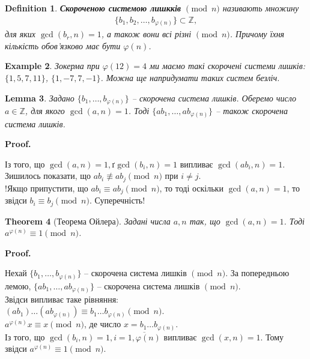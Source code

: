 \documentclass[a4paper, 10pt]{article}
\makeatletter
\theoremstyle{theoremdd}
\newtheorem{theorem}{Theorem}[subsection]
\theoremstyle{theoremdd}
\newtheorem{definition}[theorem]{Definition}
\theoremstyle{theoremdd}
\theoremstyle{theoremdd}
\newtheorem{example}[theorem]{Example}
\theoremstyle{theoremdd}
\theoremstyle{theoremdd}
\theoremstyle{theoremdd}
\newtheorem{lemma}[theorem]{Lemma}
\theoremstyle{theoremdd}
\renewenvironment{proof}[1][Proof.\\]{\par
\pushQED{\hfill \qed}%
\normalfont \topsep6\p@\@plus6\p@\relax
\trivlist
\item\relax
{\bfseries
#1\@addpunct{.}}\hspace\labelsep\ignorespaces
}{%
\popQED\endtrivlist\@endpefalse
}
\makeatother
\begin{document}
\begin{definition}
\textbf{Скороченою системою лишкків} $\!\pmod n$ називають множину 
\begin{align*}
\{b_1,b_2,\dots,b_{\varphi(n)}\} \subset \mathbb{Z},
\end{align*}
для яких $\gcd(b_r,n) = 1$, а також вони всі різні $\! \pmod n$. Причому їхня кількість обов'язково має бути $\varphi(n)$.
\end{definition}

\begin{example}
Зокерма при $\varphi(12) = 4$ ми маємо такі скорочені системи лишків: $\{1,5,7,11\}$, \quad $\{1,-7,7,-1\}$. Можна ще напридумати таких систем безліч.
\end{example}

\begin{lemma}
Задано $\{b_1,\dots,b_{\varphi(n)}\}$ -- скорочена система лишків. Оберемо число $a \in \mathbb{Z}$, для якого $\gcd(a,n) = 1$. Тоді $\{ab_1,\dots,ab_{\varphi(n)}\}$ -- також скорочена система лишків.
\end{lemma}

\begin{proof}
Із того, що $\gcd(a,n) = 1,ґ \gcd(b_i,n) = 1$ випливає $\gcd(ab_i,n) = 1$.\\
Зишилось показати, що $ab_i \not\equiv ab_j \pmod n$ при $i \neq j$.\\
!Якщо припустити, що $ab_i \equiv ab_j \pmod n$, то тоді оскільки $\gcd(a,n) = 1$, то звідси $b_i \equiv b_j \pmod n$. Суперечність!
\end{proof}

\begin{theorem}[Теорема Ойлера]
\label{Euler mod theorem}
Задані числа $a,n$ так, що $\gcd(a,n) = 1$. Тоді $a^{\varphi(n)} \equiv 1 \pmod n$.
\end{theorem}

\begin{proof}
Нехай $\{b_1,\dots,b_{\varphi(n)}\}$ -- скорочена система лишків $\!\! \pmod n$. За попередньою лемою, $\{ab_1,\dots,ab_{\varphi(n)}\}$ -- скорочена система лишків $\!\! \pmod n$.\\
Звідси випливає таке рівняння:\\
$(ab_1) \dots (ab_{\varphi(n)}) \equiv b_1 \dots b_{\varphi(n)} \pmod n$.\\
$a^{\varphi(n)}x \equiv x \pmod n$, де число $x = b_1\dots b_{\varphi(n)}$.\\ Із того, що $\gcd(b_i, n) = 1, i = \overline{1,\varphi(n)}$ випливає $\gcd(x, n) = 1$. Тому звідси $a^{\varphi(n)} \equiv 1 \pmod n$.
\end{proof}
\end{document}

